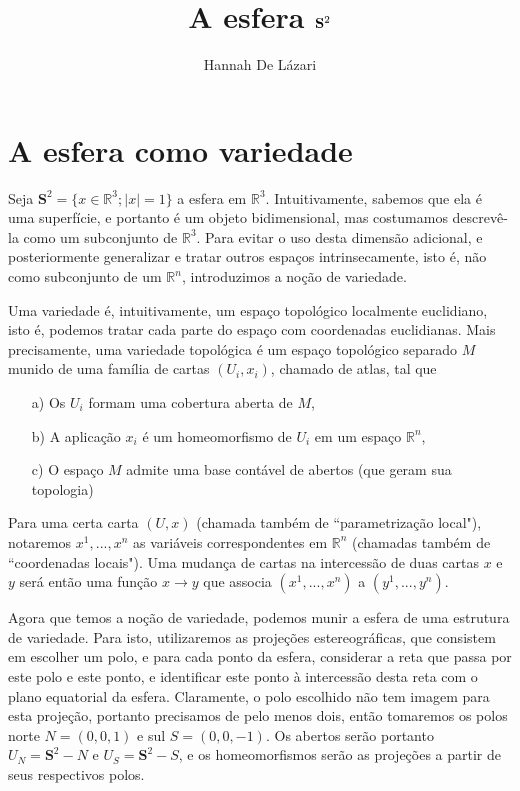 \documentclass[a4paper,12pt,notitlepage]{article}
\title{A esfera $\S^2$}
\author{Hannah De Lázari}
\date{}
\newcommand{\R}{\mathbb{R}}
\renewcommand{\S}{\mathbf{S}}
\begin{document}
	\maketitle
	
	\section{A esfera como variedade}
	Seja $\S^2=\{x\in\R^3;|x|=1\}$ a esfera em $\R^3$. Intuitivamente, sabemos que ela é uma superfície, e portanto é um objeto bidimensional, mas costumamos descrevê-la como um subconjunto de $\R^3$. Para evitar o uso desta dimensão adicional, e posteriormente generalizar e tratar outros espaços intrinsecamente, isto é, não como subconjunto de um $\R^n$, introduzimos a noção de variedade.
	
	Uma variedade é, intuitivamente, um espaço topológico localmente euclidiano, isto é, podemos tratar cada parte do espaço com coordenadas euclidianas. Mais precisamente, uma variedade topológica é um espaço topológico separado $M$ munido de uma família de cartas $(U_i,x_i)$, chamado de atlas, tal que
	\begin{itemize}
		\item[a)] Os $U_i$ formam uma cobertura aberta de $M$,
		\item[b)] A aplicação $x_i$ é um homeomorfismo de $U_i$ em um espaço $\R^n$,
		\item[c)] O espaço $M$ admite uma base contável de abertos (que geram sua topologia)
	\end{itemize}
	Para uma certa carta $(U,x)$ (chamada também de ``parametrização local"), notaremos $x^1,...,x^n$ as variáveis correspondentes em $\R^n$ (chamadas também de ``coordenadas locais"). Uma mudança de cartas na intercessão de duas cartas $x$ e $y$ será então uma função $x\to y$ que associa $(x^1,...,x^n)$ a $(y^1,...,y^n)$.
	
	Agora que temos a noção de variedade, podemos munir a esfera de uma estrutura de variedade. Para isto, utilizaremos as projeções estereográficas, que consistem em escolher um polo, e para cada ponto da esfera, considerar a reta que passa por este polo e este ponto, e identificar este ponto à intercessão desta reta com o plano equatorial da esfera. Claramente, o polo escolhido não tem imagem para esta projeção, portanto precisamos de pelo menos dois, então tomaremos os polos norte $N=(0,0,1)$ e sul $S=(0,0,-1)$. Os abertos serão portanto $U_N=\S^2-N$ e $U_S=\S^2-S$, e os homeomorfismos serão as projeções a partir de seus respectivos polos.
	
\end{document}
